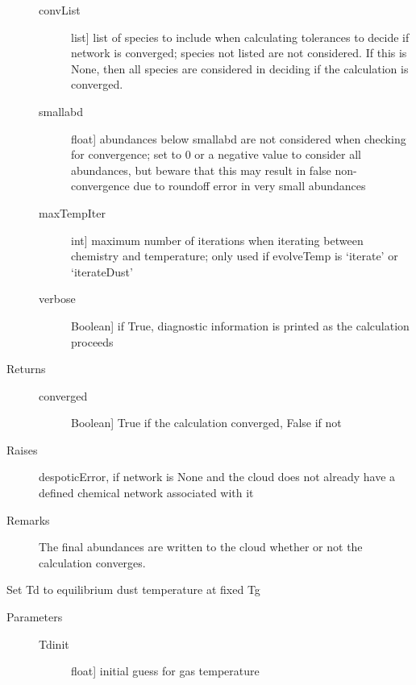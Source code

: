 \documentclass[letterpaper,10pt,english]{sphinxmanual}
\begin{document}
\begin{fulllineitems}
\begin{fulllineitems}
\begin{description}
\begin{description}
\item[{convList}] \leavevmode{[}list{]}
list of species to include when calculating tolerances to
decide if network is converged; species not listed are not
considered. If this is None, then all species are considered
in deciding if the calculation is converged.

\item[{smallabd}] \leavevmode{[}float{]}
abundances below smallabd are not considered when checking for
convergence; set to 0 or a negative value to consider all
abundances, but beware that this may result in false
non-convergence due to roundoff error in very small abundances

\item[{maxTempIter}] \leavevmode{[}int{]}
maximum number of iterations when iterating between chemistry
and temperature; only used if evolveTemp is `iterate' or
`iterateDust'

\item[{verbose}] \leavevmode{[}Boolean{]}
if True, diagnostic information is printed as the calculation
proceeds

\end{description}

\item[{Returns}] \leavevmode\begin{description}
\item[{converged}] \leavevmode{[}Boolean{]}
True if the calculation converged, False if not

\end{description}

\item[{Raises}] \leavevmode
despoticError, if network is None and the cloud does not
already have a defined chemical network associated with it

\item[{Remarks}] \leavevmode
The final abundances are written to the cloud whether or
not the calculation converges.

\end{description}

\end{fulllineitems}


\begin{fulllineitems}
\label{fulldoc:despotic.cloud.setDustTempEq}
Set Td to equilibrium dust temperature at fixed Tg
\begin{description}
\item[{Parameters}] \leavevmode\begin{description}
\item[{Tdinit}] \leavevmode{[}float{]}
initial guess for gas temperature


\end{description}
\end{description}
\end{fulllineitems}
\end{fulllineitems}
\end{document}

